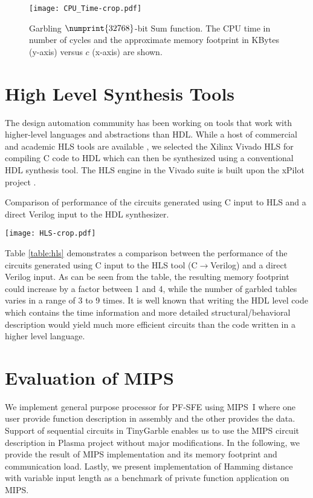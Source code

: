 \begin{figure}[ht]
	\centering
	\texttt{[image: CPU\_Time-crop.pdf]}
	\caption{Garbling $\numprint{32768}$-bit Sum function.
The CPU time in number of cycles and the approximate memory footprint in KBytes (y-axis) versus $c$ (x-axis) are shown.}
	\label{fig:cpu_time}
\end{figure}

\section{High Level Synthesis Tools}
The design automation community has been working on tools that work with higher-level languages and abstractions than HDL.
While a host of commercial and academic HLS tools are available \cite{tool:Vivado, tool:PandA, decaluwe2004myhdl, Gupta2004}, we selected the Xilinx Vivado HLS for compiling C code to HDL which can then be synthesized using a conventional HDL synthesis tool.
The HLS engine in the Vivado suite is built upon the xPilot project \cite{Chapter:Zhang2008}.

\begin{table*}[t]
\centering
\caption{Comparison of performance of the circuits generated using C input to HLS and a direct Verilog input to the HDL synthesizer.}
\label{table:hls}
\texttt{[image: HLS-crop.pdf]}
\end{table*}

Table \ref{table:hls} demonstrates a comparison between the performance of the circuits generated using C input to the HLS tool (C$\rightarrow$Verilog) and a direct Verilog input.
As can be seen from the table, the resulting memory footprint could increase by a factor between 1 and 4, while the number of garbled tables varies in a range of 3 to 9 times.
It is well known that writing the HDL level code which contains the time information and more detailed structural/behavioral description would yield much more efficient circuits than the code written in a higher level language.

\section{Evaluation of MIPS}
We implement general purpose processor for PF-SFE using MIPS~I where one user provide function description in assembly and the other provides the data.
Support of sequential circuits in TinyGarble enables us to use the MIPS circuit description in Plasma project \cite{rhoads2006plasma} without major modifications.
In the following, we provide the result of MIPS implementation and its memory footprint and communication load.
Lastly, we present implementation of Hamming distance with variable input length as a benchmark of private function application on MIPS.

